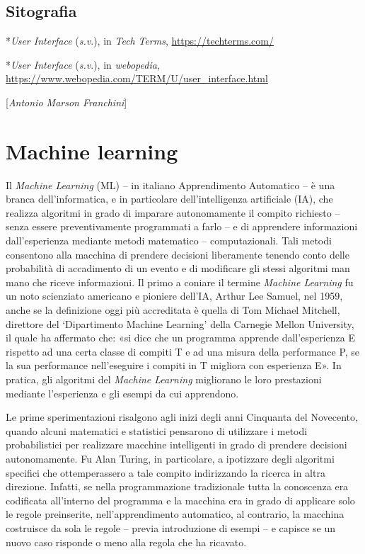 {\section*{Sitografia}
{\parindent0pt 
*\emph{User Interface} (\emph{s.v}.), in \emph{Tech} \emph{Terms},
\url{https://techterms.com/}

*\emph{User Interface} (\emph{s.v}.), in \emph{webopedia},
\url{https://www.webopedia.com/TERM/U/user_interface.html}

}

\hrulefill 

{[}\emph{Antonio Marson Franchini}{]}



\chapter{Machine learning}

Il \emph{Machine Learning} (ML) -- in italiano Apprendimento Automatico
-- è una branca dell'informatica, e in particolare dell'intelligenza
artificiale (IA), che realizza algoritmi in grado di imparare
autonomamente il compito richiesto -- senza essere preventivamente
programmati a farlo -- e di apprendere informazioni dall'esperienza
mediante metodi matematico -- computazionali. Tali metodi consentono
alla macchina di prendere decisioni liberamente tenendo conto delle
probabilità di accadimento di un evento e di modificare gli stessi
algoritmi man mano che riceve informazioni. Il primo a coniare il
termine \emph{Machine Learning} fu un noto scienziato americano e
pioniere dell'IA, Arthur Lee Samuel, nel 1959, anche se la definizione
oggi più accreditata è quella di Tom Michael Mitchell, direttore del
`Dipartimento Machine Learning' della Carnegie Mellon University, il
quale ha affermato che: «si dice che un programma apprende
dall'esperienza E rispetto ad una certa classe di compiti T e ad una
misura della performance P, se la sua performance nell'eseguire i
compiti in T migliora con esperienza E». In pratica, gli algoritmi del
\emph{Machine Learning} migliorano le loro prestazioni mediante
l'esperienza e gli esempi da cui apprendono.~

Le prime sperimentazioni risalgono agli inizi degli anni Cinquanta del
Novecento, quando alcuni matematici e statistici pensarono di utilizzare
i metodi probabilistici per realizzare macchine intelligenti in grado di
prendere decisioni autonomamente. Fu Alan Turing, in particolare, a
ipotizzare degli algoritmi specifici che ottemperassero a tale compito
indirizzando la ricerca in altra direzione. Infatti, se nella
programmazione tradizionale tutta la conoscenza era codificata
all'interno del programma e la macchina era in grado di applicare solo
le regole preinserite, nell'apprendimento automatico, al contrario, la
macchina costruisce da sola le regole -- previa introduzione di esempi
-- e capisce se un nuovo caso risponde o meno alla regola che ha
ricavato.

}
